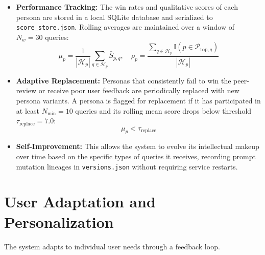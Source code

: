 \begin{itemize}
    \item \textbf{Performance Tracking:} The win rates and qualitative scores of each persona are stored in a local SQLite database and serialized to \texttt{score\_store.json}. Rolling averages are maintained over a window of $N_w = 30$ queries:
    \begin{equation}
    \mu_p = \frac{1}{|\mathcal{H}_p|} \sum_{q \in \mathcal{H}_p} \bar{S}_{p,q}, \quad \rho_p = \frac{\sum_{q \in \mathcal{H}_p} \mathbb{I}(p \in \mathcal{P}_{\text{top}, q})}{|\mathcal{H}_p|}
    \end{equation}
    
    \item \textbf{Adaptive Replacement:} Personas that consistently fail to win the peer-review or receive poor user feedback are periodically replaced with new persona variants. A persona is flagged for replacement if it has participated in at least $N_{\text{min}} = 10$ queries and its rolling mean score drops below threshold $\tau_{\text{replace}} = 7.0$:
    \begin{equation}
    \mu_p < \tau_{\text{replace}}
    \end{equation}
    
    \item \textbf{Self-Improvement:} This allows the system to evolve its intellectual makeup over time based on the specific types of queries it receives, recording prompt mutation lineages in \texttt{versions.json} without requiring service restarts.
\end{itemize}

\section{User Adaptation and Personalization}
\label{sec:user_personalization}

The system adapts to individual user needs through a feedback loop.

